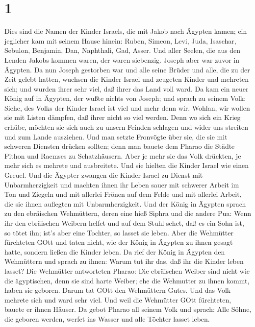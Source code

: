 \hypertarget{section}{%
\section{1}\label{section}}

 Dies sind die Namen der Kinder Israels, die mit Jakob nach
Ägypten kamen; ein jeglicher kam mit seinem Hause hinein: 
Ruben, Simeon, Levi, Juda,  Isaschar, Sebulon, Benjamin,
 Dan, Naphthali, Gad, Asser.  Und aller Seelen,
die aus den Lenden Jakobs kommen waren, der waren siebenzig. Joseph aber
war zuvor in Ägypten.  Da nun Joseph gestorben war und alle
seine Brüder und alle, die zu der Zeit gelebt hatten, 
wuchsen die Kinder Israel und zeugeten Kinder und mehreten sich; und
wurden ihrer sehr viel, daß ihrer das Land voll ward.  Da
kam ein neuer König auf in Ägypten, der wußte nichts von Joseph;
 und sprach zu seinem Volk: Siehe, des Volks der Kinder
Israel ist viel und mehr denn wir.  Wohlan, wir wollen sie
mit Listen dämpfen, daß ihrer nicht so viel werden. Denn wo sich ein
Krieg erhübe, möchten sie sich auch zu unsern Feinden schlagen und wider
uns streiten und zum Lande ausziehen.  Und man setzte
Fronvögte über sie, die sie mit schweren Diensten drücken sollten; denn
man bauete dem Pharao die Städte Pithon und Raemses zu Schatzhäusern.
 Aber je mehr sie das Volk drückten, je mehr sich es
mehrete und ausbreitete. Und sie hielten die Kinder Israel wie einen
Greuel.  Und die Ägypter zwangen die Kinder Israel zu
Dienst mit Unbarmherzigkeit  und machten ihnen ihr Leben
sauer mit schwerer Arbeit im Ton und Ziegeln und mit allerlei Frönen auf
dem Felde und mit allerlei Arbeit, die sie ihnen auflegten mit
Unbarmherzigkeit.  Und der König in Ägypten sprach zu den
ebräischen Wehmüttern, deren eine hieß Siphra und die andere Pua:
 Wenn ihr den ebräischen Weibern helfet und auf dem Stuhl
sehet, daß es ein Sohn ist, so tötet ihn; ist's aber eine Tochter, so
lasset sie leben.  Aber die Wehmütter fürchteten GOtt und
taten nicht, wie der König in Ägypten zu ihnen gesagt hatte, sondern
ließen die Kinder leben.  Da rief der König in Ägypten den
Wehmüttern und sprach zu ihnen: Warum tut ihr das, daß ihr die Kinder
leben lasset?  Die Wehmütter antworteten Pharao: Die
ebräischen Weiber sind nicht wie die ägyptischen, denn sie sind harte
Weiber; ehe die Wehmutter zu ihnen kommt, haben sie geboren.
 Darum tat GOtt den Wehmüttern Gutes. Und das Volk mehrete
sich und ward sehr viel.  Und weil die Wehmütter GOtt
fürchteten, bauete er ihnen Häuser.  Da gebot Pharao all
seinem Volk und sprach: Alle Söhne, die geboren werden, werfet ins
Wasser und alle Töchter lasset leben.

